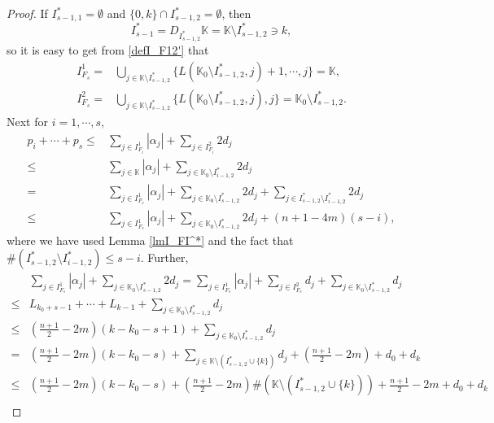 \documentclass[11pt,reqno]{amsart}
\numberwithin{equation}{section}
\theoremstyle{definition}
\begin{document}
\begin{proof}
	If $I_{s-1,1}^*=\emptyset$ and $\{0,k\}\cap I_{s-1,2}^*=\emptyset$, then
	\begin{equation}\label{Is-1*}
		I_{s-1}^*=D_{I_{s-1,2}^*}\mathbb{K}=\mathbb{K}\setminus I_{s-1,2}^*\ni k,
	\end{equation}
	so it is easy to get from \eqref{defI_F12'} that
	\begin{equation}\label{IFs}
		\begin{split}
			I_{F_s}^1=&\bigcup_{j\in\mathbb{K}\setminus I_{s-1,2}^*}\{L(\mathbb{K}_0\setminus I_{s-1,2}^*,j)+1,\cdots,j\}=\mathbb{K},\\
			I_{F_s}^2=&\bigcup_{j\in\mathbb{K}\setminus I_{s-1,2}^*}\{L(\mathbb{K}_0\setminus I_{s-1,2}^*,j),j\}=\mathbb{K}_0\setminus I_{s-1,2}^*.
		\end{split}
	\end{equation}
	Next for $i=1,\cdots,s$,
	\begin{equation}\label{pips}
		\begin{split}
			p_i+\cdots+p_s\leq&\sum_{j\in I_{F_i}^1}|\alpha_j|+\sum_{j\in I_{F_i}^2}2d_j\\
			\leq&\sum_{j\in\mathbb{K}}|\alpha_j|+\sum_{j\in\mathbb{K}_0\setminus I_{i-1,2}^*}2d_j\\
			=&\sum_{j\in I_{F_s}^1}|\alpha_j|+\sum_{j\in\mathbb{K}_0\setminus I_{s-1,2}^*}2d_j+\sum_{j\in I_{s-1,2}^*\setminus I_{i-1,2}^*}2d_j\\
			\leq&\sum_{j\in I_{F_s}^1}|\alpha_j|+\sum_{j\in\mathbb{K}_0\setminus I_{s-1,2}^*}2d_j+(n+1-4m)(s-i),
		\end{split}
	\end{equation}
	where we have used Lemma \ref{lmI_FI^*} and the fact that $\#(I_{s-1,2}^*\setminus I_{i-1,2}^*)\leq s-i$. Further,
	\begin{equation}\label{sumcase1}
		\begin{split}
			&\sum_{j\in I_{F_s}^1}|\alpha_j|+\sum_{j\in\mathbb{K}_0\setminus I_{s-1,2}^*}2d_j=\sum_{j\in I_{F_s}^1}|\alpha_j|+\sum_{j\in I_{F_s}^2}d_j+\sum_{j\in\mathbb{K}_0\setminus I_{s-1,2}^*}d_j\\
			\leq&L_{k_0+s-1}+\cdots+L_{k-1}+\sum_{j\in\mathbb{K}_0\setminus I_{s-1,2}^*}d_j\\
			\leq&(\mbox{$\frac{n+1}{2}-2m$})(k-k_0-s+1)+\sum_{j\in\mathbb{K}_0\setminus I_{s-1,2}^*}d_j\\
			=&(\mbox{$\frac{n+1}{2}-2m$})(k-k_0-s)+\sum_{j\in\mathbb{K}\setminus(I_{s-1,2}^*\cup\{k\})}d_j+(\mbox{$\frac{n+1}{2}-2m$})+d_0+d_k\\
			\leq&(\mbox{$\frac{n+1}{2}-2m$})(k-k_0-s)+(\mbox{$\frac{n+1}{2}-2m$})\#\left(\mathbb{K}\setminus(I_{s-1,2}^*\cup\{k\})\right)+\mbox{$\frac{n+1}{2}-2m$}+d_0+d_k\\

\end{split}
\end{equation}
\end{proof}
\end{document}
